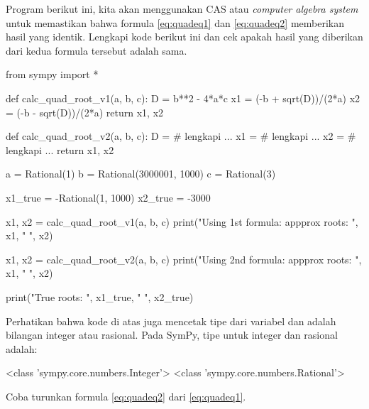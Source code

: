 \begin{soal}
Program berikut ini, kita akan menggunakan CAS atau \textit{computer algebra system}
untuk memastikan bahwa formula \eqref{eq:quadeq1} dan \eqref{eq:quadeq2} memberikan
hasil yang identik. Lengkapi kode berikut ini dan cek apakah hasil yang diberikan
dari kedua formula tersebut adalah sama.
\begin{pythoncode}
from sympy import *

def calc_quad_root_v1(a, b, c):
    D = b**2 - 4*a*c
    x1 = (-b + sqrt(D))/(2*a)
    x2 = (-b - sqrt(D))/(2*a)
    return x1, x2
  
def calc_quad_root_v2(a, b, c):
    D = # lengkapi ...
    x1 = # lengkapi ...
    x2 = # lengkapi ... 
    return x1, x2
  
a = Rational(1)
b = Rational(3000001, 1000)
c = Rational(3)
  
x1_true = -Rational(1, 1000)
x2_true = -3000
  
x1, x2 = calc_quad_root_v1(a, b, c)
print("Using 1st formula: appprox roots: ", x1, " ", x2)

x1, x2 = calc_quad_root_v2(a, b, c)
print("Using 2nd formula: appprox roots: ", x1, " ", x2)

print("True roots: ", x1_true, " ", x2_true)
\end{pythoncode}
Perhatikan bahwa kode di atas juga mencetak tipe dari variabel  dan
 adalah bilangan integer atau rasional.
Pada SymPy, tipe untuk integer dan rasional adalah:
\begin{textcode}
<class 'sympy.core.numbers.Integer'> <class 'sympy.core.numbers.Rational'>
\end{textcode}
Coba turunkan formula \eqref{eq:quadeq2} dari \eqref{eq:quadeq1}.
\end{soal}